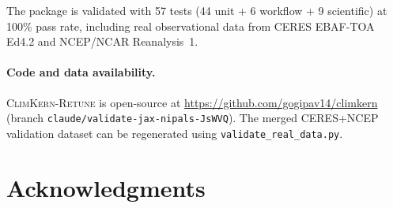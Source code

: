 \documentclass[11pt]{article}
\newcommand{\climkern}{\textsc{ClimKern-Retune}}
\begin{document}
The package is validated with 57 tests (44 unit + 6 workflow + 9
scientific) at 100\% pass rate, including real observational data
from CERES EBAF-TOA Ed4.2 and NCEP/NCAR Reanalysis~1.

\paragraph{Code and data availability.}
\climkern{} is open-source at
\url{https://github.com/gogipav14/climkern} (branch
\texttt{claude/validate-jax-nipals-JsWVQ}). The merged CERES+NCEP
validation dataset can be regenerated using
\texttt{validate\_real\_data.py}.

\section*{Acknowledgments}
\end{document}
